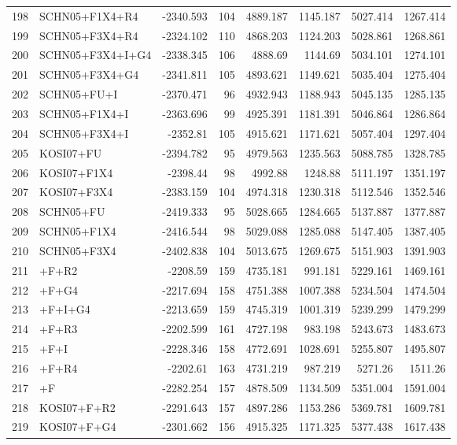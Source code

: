 \begin{longtable}{clrrrrrr}
	198 & SCHN05+F1X4+R4 & -2340.593 & 104 & 4889.187 & 1145.187 & 5027.414 & 1267.414 \\ 
	199 & SCHN05+F3X4+R4 & -2324.102 & 110 & 4868.203 & 1124.203 & 5028.861 & 1268.861 \\ 
	200 & SCHN05+F3X4+I+G4 & -2338.345 & 106 & 4888.69 & 1144.69 & 5034.101 & 1274.101 \\ 
	201 & SCHN05+F3X4+G4 & -2341.811 & 105 & 4893.621 & 1149.621 & 5035.404 & 1275.404 \\ 
	202 & SCHN05+FU+I & -2370.471 & 96 & 4932.943 & 1188.943 & 5045.135 & 1285.135 \\ 
	203 & SCHN05+F1X4+I & -2363.696 & 99 & 4925.391 & 1181.391 & 5046.864 & 1286.864 \\ 
	204 & SCHN05+F3X4+I & -2352.81 & 105 & 4915.621 & 1171.621 & 5057.404 & 1297.404 \\ 
	205 & KOSI07+FU & -2394.782 & 95 & 4979.563 & 1235.563 & 5088.785 & 1328.785 \\ 
	206 & KOSI07+F1X4 & -2398.44 & 98 & 4992.88 & 1248.88 & 5111.197 & 1351.197 \\ 
	207 & KOSI07+F3X4 & -2383.159 & 104 & 4974.318 & 1230.318 & 5112.546 & 1352.546 \\ 
	208 & SCHN05+FU & -2419.333 & 95 & 5028.665 & 1284.665 & 5137.887 & 1377.887 \\ 
	209 & SCHN05+F1X4 & -2416.544 & 98 & 5029.088 & 1285.088 & 5147.405 & 1387.405 \\ 
	210 & SCHN05+F3X4 & -2402.838 & 104 & 5013.675 & 1269.675 & 5151.903 & 1391.903 \\ 
	211 & \gy+F+R2 & -2208.59 & 159 & 4735.181 & 991.181 & 5229.161 & 1469.161 \\ 
	212 & \gy+F+G4 & -2217.694 & 158 & 4751.388 & 1007.388 & 5234.504 & 1474.504 \\ 
	213 & \gy+F+I+G4 & -2213.659 & 159 & 4745.319 & 1001.319 & 5239.299 & 1479.299 \\ 
	214 & \gy+F+R3 & -2202.599 & 161 & 4727.198 & 983.198 & 5243.673 & 1483.673 \\ 
	215 & \gy+F+I & -2228.346 & 158 & 4772.691 & 1028.691 & 5255.807 & 1495.807 \\ 
	216 & \gy+F+R4 & -2202.61 & 163 & 4731.219 & 987.219 & 5271.26 & 1511.26 \\ 
	217 & \gy+F & -2282.254 & 157 & 4878.509 & 1134.509 & 5351.004 & 1591.004 \\ 
	218 & KOSI07+F+R2 & -2291.643 & 157 & 4897.286 & 1153.286 & 5369.781 & 1609.781 \\ 
	219 & KOSI07+F+G4 & -2301.662 & 156 & 4915.325 & 1171.325 & 5377.438 & 1617.438 \\ 

\end{longtable}
